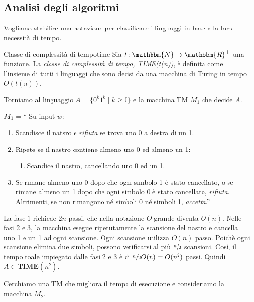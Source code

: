 \documentclass[12pt]{report}
\newcounter{definition}
\newcommand{\nmu}{}
\begin{document}
\subsection{Analisi degli algoritmi}
Vogliamo stabilire una notazione per classificare i linguaggi in base alla loro necessità di tempo.
\begin{definition}{\nmu Classe di complessità di tempo}{time}
	Sia $t: \mathbbm{N} \to \mathbbm{R}^+$ una funzione. La \textit{classe di complessità di tempo, TIME(t(n))}, è definita come l'insieme di tutti i linguaggi che sono decisi da una macchina di Turing in tempo $O(t(n))$.
\end{definition}
Torniamo al linguaggio $A = \{0^k1^k \mid k \geq 0\}$ e la macchina TM $M_1$ che decide $A$.

$M_1 = ``$ Su input $w$:
\begin{enumerate}
	\item Scandisce il natsro e \textit{rifiuta} se trova uno 0 a destra di un 1.
	\item Ripete se il nastro contiene almeno uno 0 ed almeno un 1:
	\begin{enumerate}
		\item Scandice il nastro, cancellando uno 0 ed un 1.
	\end{enumerate}
	\item Se rimane almeno uno 0 dopo che ogni simbolo 1 è stato cancellato, o se rimane almeno un 1 dopo che ogni simbolo 0 è stato cancellato, \textit{rifiuta}. Altrimenti, se non rimangono né simboli 0 né simboli 1, \textit{accetta}.''
\end{enumerate}
La fase $1$ richiede $2n$ passi, che nella notazione $O$-grande diventa $O(n)$. Nelle fasi 2 e 3, la macchina esegue ripetutamente la scansione del nastro e cancella uno 1 e un 1 ad ogni scansione. Ogni scansione utilizza $O(n)$ passo. Poichè ogni scansione elimina due simboli, possono verificarsi al più $\sfrac{n}{2}$ scansioni. Così, il tempo toale impiegato dalle fasi 2 e 3 è di $\sfrac{n}{2}O(n) = O(n^2)$ passi. Quindi $A \in \mathbf{TIME}(n^2)$.

Cerchiamo una TM che migliora il tempo di esecuzione e consideriamo la macchina $M_2$.
\end{document}
